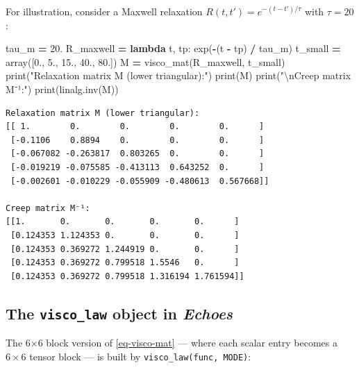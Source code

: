 \documentclass[
  a4paper,
  numbers=noendperiod,
  DIV=12]{scrreprt}
\newenvironment{Shaded}{\begin{snugshade}}{\end{snugshade}}
\newcommand{\BuiltInTok}[1]{#1}
\newcommand{\CharTok}[1]{\textcolor[rgb]{0.31,0.60,0.02}{#1}}
\newcommand{\FloatTok}[1]{\textcolor[rgb]{0.00,0.00,0.81}{#1}}
\newcommand{\KeywordTok}[1]{\textcolor[rgb]{0.13,0.29,0.53}{\textbf{#1}}}
\newcommand{\NormalTok}[1]{#1}
\newcommand{\OperatorTok}[1]{\textcolor[rgb]{0.81,0.36,0.00}{\textbf{#1}}}
\newcommand{\StringTok}[1]{\textcolor[rgb]{0.31,0.60,0.02}{#1}}
\begin{document}
For illustration, consider a Maxwell relaxation
\(R(t,t') = e^{-(t-t')/\tau}\) with \(\tau=20\):

\begin{Shaded}
\begin{Highlighting}[]
\NormalTok{tau\_m }\OperatorTok{=} \FloatTok{20.}
\NormalTok{R\_maxwell }\OperatorTok{=} \KeywordTok{lambda}\NormalTok{ t, tp: exp(}\OperatorTok{{-}}\NormalTok{(t }\OperatorTok{{-}}\NormalTok{ tp) }\OperatorTok{/}\NormalTok{ tau\_m)}
\NormalTok{t\_small }\OperatorTok{=}\NormalTok{ array([}\FloatTok{0.}\NormalTok{, }\FloatTok{5.}\NormalTok{, }\FloatTok{15.}\NormalTok{, }\FloatTok{40.}\NormalTok{, }\FloatTok{80.}\NormalTok{])}
\NormalTok{M }\OperatorTok{=}\NormalTok{ visco\_mat(R\_maxwell, t\_small)}
\BuiltInTok{print}\NormalTok{(}\StringTok{"Relaxation matrix M (lower triangular):"}\NormalTok{)}
\BuiltInTok{print}\NormalTok{(M)}
\BuiltInTok{print}\NormalTok{(}\StringTok{"}\CharTok{\textbackslash{}n}\StringTok{Creep matrix M⁻¹:"}\NormalTok{)}
\BuiltInTok{print}\NormalTok{(linalg.inv(M))}
\end{Highlighting}
\end{Shaded}

\begin{verbatim}
Relaxation matrix M (lower triangular):
[[ 1.        0.        0.        0.        0.      ]
 [-0.1106    0.8894    0.        0.        0.      ]
 [-0.067082 -0.263817  0.803265  0.        0.      ]
 [-0.019219 -0.075585 -0.413113  0.643252  0.      ]
 [-0.002601 -0.010229 -0.055909 -0.480613  0.567668]]

Creep matrix M⁻¹:
[[1.       0.       0.       0.       0.      ]
 [0.124353 1.124353 0.       0.       0.      ]
 [0.124353 0.369272 1.244919 0.       0.      ]
 [0.124353 0.369272 0.799518 1.5546   0.      ]
 [0.124353 0.369272 0.799518 1.316194 1.761594]]
\end{verbatim}

\subsection{\texorpdfstring{The \texttt{visco\_law} object in
\emph{Echoes}}{The visco\_law object in Echoes}}\label{the-visco_law-object-in-echoes}

The 6×6 block version of \ref{eq-visco-mat} --- where each scalar entry
becomes a \(6\times 6\) tensor block --- is built by
\texttt{visco\_law(func,\ MODE)}:
\end{document}
